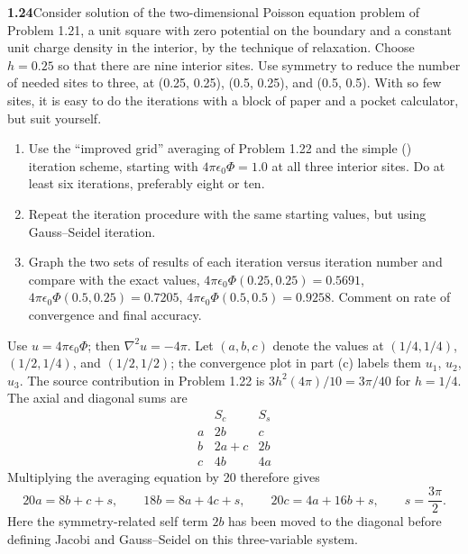 \par\bigskip
\noindent\textbf{1.24}\quad Consider solution of the two-dimensional Poisson equation problem of Problem 1.21, a unit square with zero potential on the boundary and a constant unit charge density in the interior, by the technique of relaxation. Choose $h=0.25$ so that there are nine interior sites. Use symmetry to reduce the number of needed sites to three, at (0.25, 0.25), (0.5, 0.25), and (0.5, 0.5). With so few sites, it is easy to do the iterations with a block of paper and a pocket calculator, but suit yourself.
\begin{enumerate}
\item[(a)] Use the ``improved grid'' averaging of Problem 1.22 and the simple () iteration scheme, starting with $4\pi\epsilon_{0}\Phi=1.0$ at all three interior sites. Do at least six iterations, preferably eight or ten.
\item[(b)] Repeat the iteration procedure with the same starting values, but using Gauss--Seidel iteration.
\item[(c)] Graph the two sets of results of each iteration versus iteration number and compare with the exact values, $4\pi\epsilon_{0}\Phi(0.25,0.25)=0.5691$, $4\pi\epsilon_{0}\Phi(0.5,0.25)=0.7205$, $4\pi\epsilon_{0}\Phi(0.5,0.5)=0.9258$. Comment on rate of convergence and final accuracy.
\end{enumerate}
\solution
Use $u=4\pi\epsilon_0\Phi$; then $\nabla^2u=-4\pi$.
Let $(a,b,c)$ denote the values at $(1/4,1/4)$, $(1/2,1/4)$, and $(1/2,1/2)$; the convergence plot in part (c) labels them $u_1$, $u_2$, $u_3$.
The source contribution in Problem 1.22 is
$3h^2(4\pi)/10=3\pi/40$ for $h=1/4$.
The axial and diagonal sums are
\[
\begin{array}{c|cc}
& S_c&S_s\\\hline
a&2b&c\\
b&2a+c&2b\\
c&4b&4a
\end{array}
\]
Multiplying the averaging equation by 20 therefore gives
\[
20a=8b+c+s,\qquad18b=8a+4c+s,\qquad20c=4a+16b+s,
\qquad s=\frac{3\pi}{2}.
\]
Here the symmetry-related self term $2b$ has been moved to the diagonal
before defining Jacobi and Gauss--Seidel on this three-variable system.
